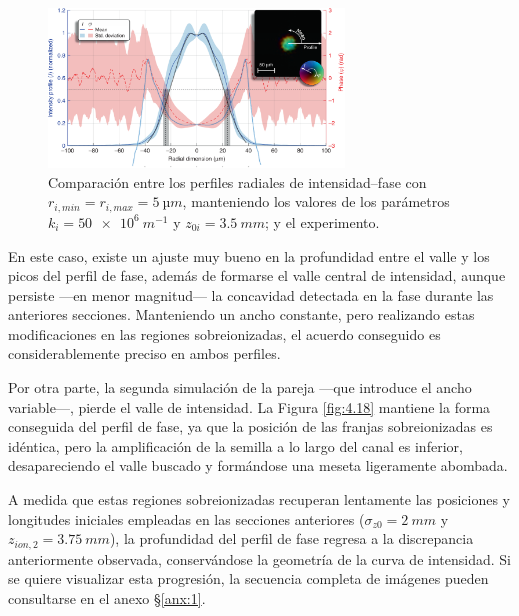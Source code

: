 \begin{figure}[htbp]
  \centering
  \includegraphics[width=0.7\textwidth]{Figuras/ch4_cmp31.png}
  \caption{Comparación entre los perfiles radiales de intensidad--fase con $r_{i,min}=r_{i,max}=\qty{5}{µm}$, manteniendo los valores de los parámetros $k_{i}=\qty{50e6}{m^{-1}}$ y $z_{0i}=\qty{3.5}{mm}$; y el experimento.}
  \label{fig:4.17}
\end{figure}

En este caso, existe un ajuste muy bueno en la profundidad entre el valle y los picos del perfil de fase, además de formarse el valle central de intensidad, aunque persiste ---en menor magnitud--- la concavidad detectada en la fase durante las anteriores secciones. Manteniendo un ancho constante, pero realizando estas modificaciones en las regiones sobreionizadas, el acuerdo conseguido es considerablemente preciso en ambos perfiles.

Por otra parte, la segunda simulación de la pareja ---que introduce el ancho variable---, pierde el valle de intensidad. La Figura \ref{fig:4.18} mantiene la forma conseguida del perfil de fase, ya que la posición de las franjas sobreionizadas es idéntica, pero la amplificación de la semilla a lo largo del canal es inferior, desapareciendo el valle buscado y formándose una meseta ligeramente abombada.

A medida que estas regiones sobreionizadas recuperan lentamente las posiciones y longitudes iniciales empleadas en las secciones anteriores ($\sigma_{z0}=\qty{2}{mm}$ y $z_{ion,2}=\qty{3.75}{mm}$), la profundidad del perfil de fase regresa a la discrepancia anteriormente observada, conservándose la geometría de la curva de intensidad. Si se quiere visualizar esta progresión, la secuencia completa de imágenes pueden consultarse en el anexo \S\ref{anx:1}.

